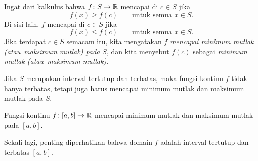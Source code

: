 Ingat dari kalkulus bahwa $f \colon S \to {\mathbb{R}}$ mencapai
\emph{}%
di $c \in S$ jika
\begin{equation*}
f(x) \geq f(c) \qquad \text{untuk semua } x \in S.
\end{equation*}
Di sisi lain, $f$ mencapai
\emph{}%
di $c \in S$ jika
\begin{equation*}
f(x) \leq f(c) \qquad \text{untuk semua } x \in S.
\end{equation*}
Jika terdapat $c \in S$ semacam itu, kita mengatakan
$f$ \emph{mencapai minimum mutlak (atau\ maksimum mutlak) pada
$S$}, dan kita menyebut
$f(c)$ sebagai \emph{minimum mutlak (atau\ maksimum mutlak)}.
\begin{myfigureht}
\caption{$f \colon [a,b] \to \R$ mencapai maksimum mutlak $f(c)$ di
$c$, dan minimum mutlak $f(d)$ di $d$.\label{fig:minmax}}
\end{myfigureht}

Jika $S$ merupakan interval tertutup
dan terbatas, maka fungsi kontinu $f$
tidak hanya terbatas, tetapi juga harus mencapai minimum mutlak dan maksimum
mutlak pada $S$.

\begin{thm}
%
%
%
Fungsi kontinu $f \colon [a,b] \to \R$
mencapai minimum mutlak dan maksimum mutlak pada $[a,b]$.
\end{thm}

Sekali lagi, penting diperhatikan bahwa domain $f$ adalah interval tertutup dan terbatas $[a,b]$.

